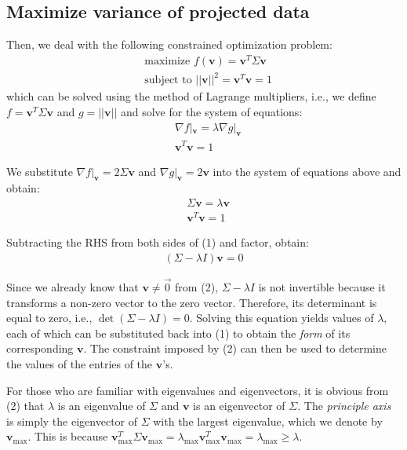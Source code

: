 \documentclass{article}
\newcommand{\vecv}{\boldsymbol{v}}
\begin{document}
\subsection{Maximize variance of projected data}

Then, we deal with the following constrained optimization problem:
\begin{align*}
&\text{maximize } f(\vecv) = \vecv^T \Sigma \vecv \\
&\text{subject to } ||\vecv||^2 = \vecv^T \vecv = 1
\end{align*}
which can be solved using the method of Lagrange multipliers, i.e., we define $f=\vecv^T \Sigma \vecv$ and $g=||\vecv||$ and solve for the system of equations:
\begin{align*}
&\nabla f |_{\vecv} = \lambda \nabla g |_{\vecv}\\
&\vecv^T \vecv = 1
\end{align*}

We substitute $\nabla f |_{\vecv} = 2 \Sigma \vecv$ and $\nabla g |_{\vecv} = 2 \vecv$ into the system of equations above and obtain:
\begin{align}
&\Sigma \vecv = \lambda\vecv\\
&\vecv^T \vecv = 1
\end{align}

Subtracting the RHS from both sides of (1) and factor, obtain:
\begin{align}
(\Sigma - \lambda I)\vecv=0
\end{align}

Since we already know that $\vecv \neq \vec{0}$ from (2), $\Sigma - \lambda I$ is not invertible because it transforms a non-zero vector to the zero vector. Therefore, its determinant is equal to zero, i.e., $\det(\Sigma - \lambda I)=0$. Solving this equation yields values of $\lambda$, each of which can be substituted back into (1) to obtain the \textit{form} of its corresponding $\vecv$. The constraint imposed by (2) can then be used to determine the values of the entries of the $\vecv$'s.

\vspace{3mm}
For those who are familiar with eigenvalues and eigenvectors, it is obvious from (2) that $\lambda$ is an eigenvalue of $\Sigma$ and $\vecv$ is an eigenvector of $\Sigma$. The \textit{principle axis} is simply the eigenvector of $\Sigma$ with the largest eigenvalue, which we denote by $\vecv_{\max}$. This is because 
$\vecv_{\max}^T \Sigma \vecv_{\max}=\lambda_{\max}\vecv_{\max}^T\vecv_{\max}=\lambda_{\max}\geq \lambda$.
\end{document}
